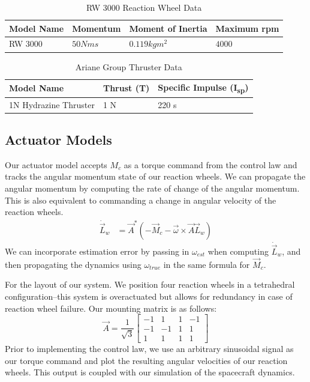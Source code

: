 \begin{table}[H]
\centering
\caption{RW 3000 Reaction Wheel Data \cite{RW3000Datasheet}}
\label{tab:reaction_wheel_data}
\begin{tabular}{|l|l|l|l|}
\hline
Model Name & Momentum     & Moment of Inertia    & Maximum rpm \\ \hline
RW 3000    & $50 N m s$   & $0.119 kg m^2$       & $4000$        \\ \hline
\end{tabular}
\end{table}

\begin{table}[H]
\centering
\caption{Ariane Group Thruster Data}
\label{tab:reaction_thruster}
\begin{tabular}{|l|l|l|}
\hline
Model Name              & Thrust (T)    & Specific Impulse (I\textsubscript{sp})\\ \hline
1N Hydrazine Thruster   & 1 N           & 220 s \\ \hline
\end{tabular}
\end{table}

\subsection{Actuator Models}
Our actuator model accepts $M_{c}$ as a torque command from the control law and tracks the angular momentum state of our reaction wheels. We can propagate the angular momentum by computing the rate of change of the angular momentum. This is also equivalent to commanding a change in angular velocity of the reaction wheels.
\begin{align*}
    \Dot{\Vec{L}}_{w} &= \Vec{A}^{*} (-\Vec{M}_{c} - \Vec{\omega} \times \Vec{A} \Vec{L}_{w})
\end{align*}
We can incorporate estimation error by passing in $\omega_{est}$ when computing $\Dot{\Vec{L}}_{w}$, and then propagating the dynamics using $\omega_{true}$ in the same formula for $\Vec{M}_{c}$.

For the layout of our system. We position four reaction wheels in a tetrahedral configuration–this system is overactuated but allows for redundancy in case of reaction wheel failure. Our mounting matrix is as follows:
\begin{equation*}
    \Vec{A} = \frac{1}{\sqrt{3}} \begin{bmatrix}
        -1 & 1 & 1 & -1 \\
        -1 & -1 & 1 & 1 \\
        1 & 1 & 1 & 1
    \end{bmatrix}
\end{equation*}
Prior to implementing the control law, we use an arbitrary sinusoidal signal as our torque command and plot the resulting angular velocities of our reaction wheels. This output is coupled with our simulation of the spacecraft dynamics.

